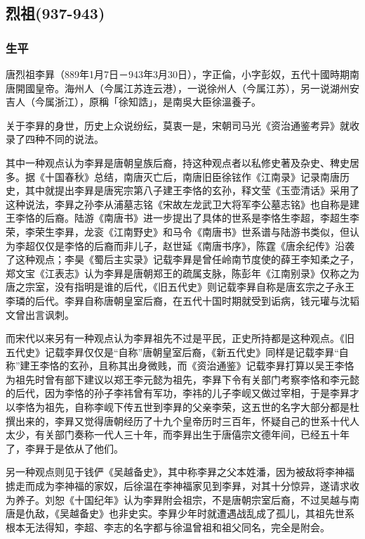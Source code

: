 
\subsection{烈祖\tiny(937-943)}

\subsubsection{生平}

唐烈祖李昪（889年1月7日－943年3月30日），字正倫，小字彭奴，五代十國時期南唐開國皇帝。海州人（今属江苏连云港），一说徐州人（今属江苏），另一说湖州安吉人（今属浙江），原稱「徐知誥」，是南吳大臣徐溫養子。

关于李昪的身世，历史上众说纷纭，莫衷一是，宋朝司马光《资治通鉴考异》就收录了四种不同的说法。

其中一种观点认为李昪是唐朝皇族后裔，持这种观点者以私修史著及杂史、稗史居多。据《十国春秋》总结，南唐灭亡后，南唐旧臣徐铉作《江南录》记录南唐历史，其中就提出李昪是唐宪宗第八子建王李恪的玄孙，释文莹《玉壶清话》采用了这种说法，李昪之孙李从浦墓志铭《宋故左龙武卫大将军李公墓志铭》也自称是建王李恪的后裔。陆游《南唐书》进一步提出了具体的世系是李恪生李超，李超生李荣，李荣生李昪，龙衮《江南野史》和马令《南唐书》世系谱与陆游书类似，但认为李超仅仅是李恪的后裔而非儿子，赵世延《南唐书序》，陈霆《唐余纪传》沿袭了这种观点；李昊《蜀后主实录》记载李昪是曾任岭南节度使的薛王李知柔之子，郑文宝《江表志》认为李昪是唐朝郑王的疏属支脉，陈彭年《江南别录》仅称之为唐之宗室，没有指明是谁的后代，《旧五代史》则记载李昪自称是唐玄宗之子永王李璘的后代。李昪自称唐朝皇室后裔，在五代十国时期就受到诟病，钱元瓘与沈韬文曾出言讽刺。

而宋代以来另有一种观点认为李昪祖先不过是平民，正史所持都是这种观点。《旧五代史》记载李昪仅仅是“自称”唐朝皇室后裔，《新五代史》同样是记载李昪“自称”建王李恪的玄孙，且称其出身微贱，而《资治通鉴》记载李昪打算以吴王李恪为祖先时曾有部下建议以郑王李元懿为祖先，李昪下令有关部门考察李恪和李元懿的后代，因为李恪的孙子李祎曾有军功，李祎的儿子李岘又做过宰相，于是李昪才以李恪为祖先，自称李岘下传五世到李昪的父亲李荣，这五世的名字大部分都是杜撰出来的，李昪又觉得唐朝经历了十九个皇帝历时三百年，怀疑自己的世系十代人太少，有关部门奏称一代人三十年，而李昪出生于唐僖宗文德年间，已经五十年了，李昪于是依从了他们。

另一种观点则见于钱俨《吴越备史》，其中称李昪之父本姓潘，因为被敌将李神福掳走而成为李神福的家奴，后徐温在李神福家见到李昪，对其十分惊异，遂请求收为养子。刘恕《十国纪年》认为李昪附会祖宗，不是唐朝宗室后裔，不过吴越与南唐是仇敌，《吴越备史》也非史实。李昪少年时就遭遇战乱成了孤儿，其祖先世系根本无法得知，李超、李志的名字都与徐温曾祖和祖父同名，完全是附会。

